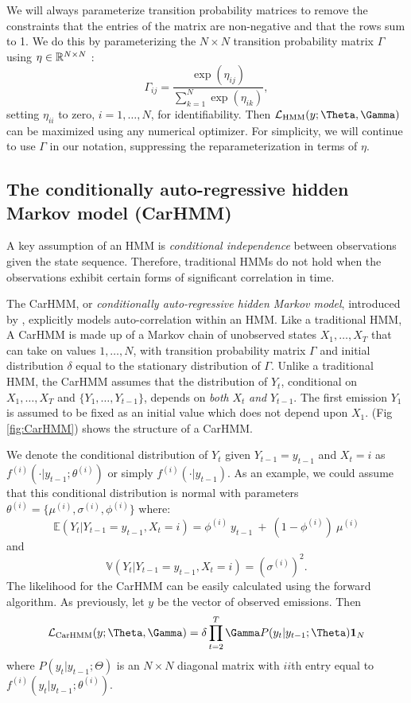 We will always parameterize transition probability matrices to remove the constraints that the entries of the matrix are non-negative and that the rows sum to 1.  We do this by parameterizing the $N \times N$ transition probability matrix $\Gamma$ using $\eta \in \mathbb{R}^{N \times N}$ \citep{Barajas:2017}:
%
\[
\Gamma_{ij} = \frac{\exp(\eta_{ij})}{\sum_{k=1}^N \exp(\eta_{ik})}, 
\]
%
setting $\eta_{ii}$  to zero, $i=1,\ldots, N$, for identifiability.  Then $\calL_{\text{HMM}}(y;\Theta,\Gamma)$ can be maximized using any numerical optimizer.  For simplicity, we will continue to use $\Gamma$ in our notation, suppressing the reparameterization in terms of  $\eta$.


\subsection{The conditionally auto-regressive hidden Markov model (CarHMM)}

A key assumption of an HMM is \textit{conditional independence} between observations given the state sequence.  Therefore, traditional HMMs do not hold when the observations exhibit certain forms of significant correlation in time.

The CarHMM, or \textit{conditionally auto-regressive hidden Markov model}, introduced by \citep{Lawler:2019}, explicitly models auto-correlation within an HMM. Like a traditional HMM, A CarHMM is made up of a Markov chain of unobserved states $X_1,\ldots, X_T$ that can take on values $1, \ldots, N$, with transition probability matrix $\Gamma$ and initial distribution $\delta$ equal to the stationary distribution of $\Gamma$. Unlike a traditional HMM, the CarHMM assumes that the distribution of $Y_t$, conditional on $X_1,\ldots, X_T$ and $ \{Y_1,\ldots, Y_{t-1}\}$, depends on \textit{both} $X_t$ \textit{and} $Y_{t-1}$. 
The first emission $Y_1$ is assumed to be fixed as an initial value which does not depend upon $X_1$. (Fig \ref{fig:CarHMM}) shows the structure of a CarHMM.

%
We denote the conditional distribution of $Y_t$ given $Y_{t-1}= y_{t-1}$ and $ X_t=i$ as $f^{(i)}( \cdot | y_{t-1}; \theta^{(i)})$ or simply $f^{(i)}( \cdot | y_{t-1})$.
As an example, we could assume that this conditional distribution is normal with parameters $\theta^{(i)} = \{\mu^{(i)},\sigma^{(i)},\phi^{(i)}\}$ where:
%
\[
\mathbb{E}(Y_t|Y_{t-1} = y_{t-1},X_t=i) = \phi^{(i)} ~ y_{t-1} ~+ ~(1-\phi^{(i)})  ~\mu^{(i)}
\]
and
\[
\mathbb{V}(Y_t| Y_{t-1} =y_{t-1}, X_t = i) = (\sigma^{(i)})^2.
\]
%
The likelihood for the CarHMM can be easily calculated using the forward algorithm. As previously, let $y$ be the vector of observed emissions. Then
\begin{equation}
    \calL_{\text{CarHMM}}(y;\Theta,\Gamma) = \delta \prod_{t=2}^T \Gamma P(y_t|y_{t-1};\Theta) \mathbf{1}_N
    \label{CarHMM_likelihood}
\end{equation}
where
%
$P(y_t|y_{t-1};\Theta)$ is an $N \times N$ diagonal matrix with $ii$th entry equal to $f^{(i)}(y_t|y_{t-1}; \theta^{(i)})$.
%
